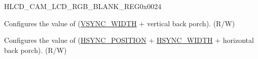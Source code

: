 \begin{register}{H}{LCD\_CAM\_LCD\_RGB\_BLANK\_REG}{0x0024}\label{regdesc:LCDCAMLCDRGBBLANKREG}
%
%
\regnewline%
\begin{regdesc}\begin{reglist}
\label{fielddesc:LCDCAMLCDVBFRONT}\item [LCD\_CAM\_LCD\_VB\_FRONT] Configures the value of (\hyperref[fielddesc:LCDCAMLCDVSYNCWIDTH]{VSYNC\_WIDTH} + vertical back porch). (R/W)
\label{fielddesc:LCDCAMLCDHBFRONT}\item [LCD\_CAM\_LCD\_HB\_FRONT] Configures the value of (\hyperref[fielddesc:LCDCAMLCDHSYNCPOSITION]{HSYNC\_POSITION} + \hyperref[fielddesc:LCDCAMLCDHSYNCWIDTH]{HSYNC\_WIDTH} + horizontal back porch). (R/W)
\end{reglist}\end{regdesc}
\end{register}

